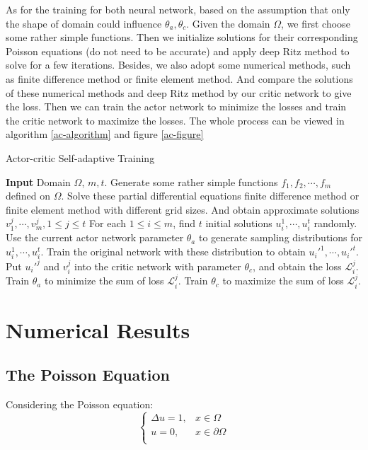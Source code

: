 \documentclass{article}
\begin{document}
\par As for the training for both neural network, based on the assumption that only the shape of domain could influence $\theta_{a}, \theta_{c}$. Given the domain $\Omega$, we first choose some rather simple functions. Then we initialize solutions for their corresponding Poisson equations (do not need to be accurate) and apply deep Ritz method to solve for a few iterations. Besides, we also adopt some numerical methods, such as finite difference method or finite element method. And compare the solutions of these numerical methods and deep Ritz method by our critic network to give the loss. Then we can train the actor network to minimize the losses and train the critic network to maximize the losses. The whole process can be viewed in algorithm 
\ref{ac-algorithm} and figure \ref{ac-figure}
\begin{algorithm}
	\caption{Actor-critic Self-adaptive Training}
	\label{ac-algorithm}
	\begin{algorithmic}[1]
		\State\textbf{Input} Domain $\Omega$, $m, t$.
		\State Generate some rather simple functions $f_1, f_{2}, \cdots, f_{m}$ defined on $\Omega$.
		\State Solve these partial differential equations finite difference method or finite element method with different grid sizes. And obtain approximate solutions $v_{1}^{j}, \cdots, v_{m}^{j}, 1\le j\le t$
		\State For each $1\le i\le m$, find $t$ initial solutions $u_{i}^{1}, \cdots, u_{i}^{t}$ randomly.
		\State Use the current actor network parameter $\theta_{a}$ to generate sampling distributions for $u_{i}^{1}, \cdots, u_{i}^{t}$.
		\State Train the original network with these distribution to obtain $u_{i}'^{1}, \cdots, u_{i}'^{t}$.
		\State Put $u_{i}'^{j}$ and $v_{i}^{j}$ into the critic network with parameter $\theta_{c}$, and obtain the loss $\mathcal{L}_{i}^{j}$.
		\State Train $\theta_{a}$ to minimize the sum of loss $\mathcal{L}_{i}^{j}$.
		\State Train $\theta_{c}$ to maximize the sum of loss $\mathcal{L}_{i}^{j}$.
 	\end{algorithmic}
\end{algorithm}



\section{Numerical Results}

\subsection{The Poisson Equation}
\par Considering the Poisson equation:
\begin{equation}
\left\{
\begin{aligned}
 \Delta u=1,& x\in \Omega \\
 u=0, &x\in \partial \Omega \\
 \end{aligned}
\right.
\end{equation}
\end{document}

